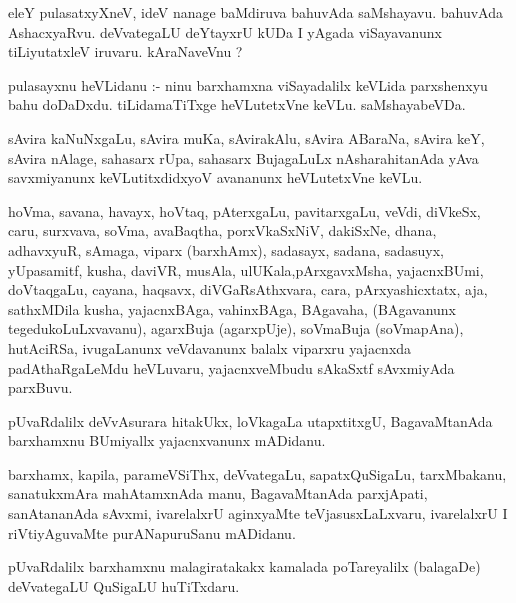 \documentclass{article}
\begin{document}
\begin{mn}
eleY pulasatxyXneV,  ideV nanage baMdiruva  bahuvAda saMshayavu.  bahuvAda  AshacxyaRvu.  
deVvategaLU  deYtayxrU kUDa I yAgada viSayavanunx  tiLiyutatxleV  iruvaru.  kAraNaveVnu ?
\end{mn}

\begin{mn}
pulasayxnu  heVLidanu :- ninu  barxhamxna  viSayadalilx  keVLida parxshenxyu bahu doDaDxdu.  
tiLidamaTiTxge heVLutetxVne keVLu.  saMshayabeVDa.
\end{mn}

\begin{mn}
sAvira kaNuNxgaLu, sAvira muKa, sAvirakAlu, sAvira ABaraNa,  sAvira keY, sAvira nAlage, sahasarx rUpa,  
sahasarx BujagaLuLx  nAsharahitanAda yAva savxmiyanunx keVLutitxdidxyoV avananunx heVLutetxVne keVLu.
\end{mn}

\begin{mn}
hoVma, savana, havayx, hoVtaq,  pAterxgaLu,  pavitarxgaLu, veVdi, diVkeSx,  caru, surxvava,  
soVma,  avaBaqtha,  porxVkaSxNiV, dakiSxNe, dhana, adhavxyuR, sAmaga, viparx (barxhAmx), sadasayx,  
sadana, sadasuyx,  yUpasamitf, kusha, daviVR, musAla, ulUKala,pArxgavxMsha, yajacnxBUmi, doVtaqgaLu, 
cayana, haqsavx,  diVGaRsAthxvara,  cara,  pArxyashicxtatx,  aja,  sathxMDila kusha, yajacnxBAga,  
vahinxBAga, BAgavaha, (BAgavanunx tegedukoLuLxvavanu), agarxBuja (agarxpUje),  soVmaBuja (soVmapAna), 
hutAciRSa, ivugaLanunx  veVdavanunx balalx viparxru yajacnxda padAthaRgaLeMdu heVLuvaru,  
yajacnxveMbudu sAkaSxtf sAvxmiyAda parxBuvu.
\end{mn}

\begin{mn}
pUvaRdalilx deVvAsurara  hitakUkx,  loVkagaLa utapxtitxgU, BagavaMtanAda 
barxhamxnu BUmiyallx yajacnxvanunx mADidanu.
\end{mn}

\begin{mn}
barxhamx,  kapila,  parameVSiThx, deVvategaLu, sapatxQuSigaLu, tarxMbakanu,  sanatukxmAra 
mahAtamxnAda manu,  BagavaMtanAda  parxjApati, sanAtananAda sAvxmi, ivarelalxrU aginxyaMte  
teVjasusxLaLxvaru, ivarelalxrU I riVtiyAguvaMte purANapuruSanu mADidanu.
\end{mn}

\begin{mn}
pUvaRdalilx barxhamxnu malagiratakakx  kamalada  poTareyalilx (balagaDe) 
deVvategaLU QuSigaLU huTiTxdaru.
\end{mn}
\end{document}
